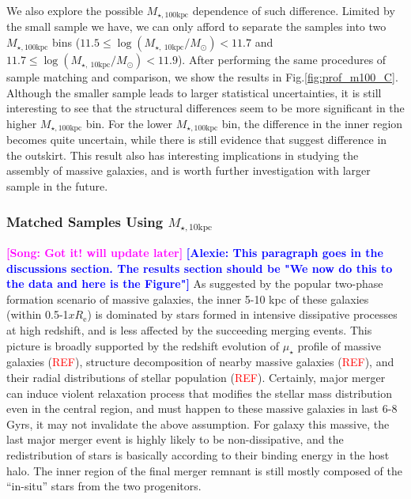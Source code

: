 \documentclass{emulateapj}
\def\minn{{$M_{\star,10\mathrm{kpc}}$}}
\def\mtot{{$M_{\star,100\mathrm{kpc}}$}}
\def\mden{{$\mu_{\star}$}}
\newcommand{\addref}{{\textcolor{red}{REF}}}
\newcommand{\song}[1]{\textcolor{magenta}{\textbf{[Song: #1]}}}
\newcommand{\alexie}[1]{\textcolor{blue}{\textbf{[Alexie: #1]}}}
\begin{document}
\begin{CJK*}{UTF8}{gbsn}
    We also explore the possible \mtot{} dependence of such difference.  
    Limited by the small sample we have, we can only afford to separate the 
    samples into two \mtot{} bins 
    ($11.5 \leq \log (M_{\star,\ 10\mathrm{kpc}}/M_{\odot}) < 11.7$ and 
     $11.7 \leq \log (M_{\star,\ 10\mathrm{kpc}}/M_{\odot}) < 11.9$).  
    After performing the same procedures of sample matching and comparison, 
    we show the results in Fig.\ref{fig:prof_m100_C}.  
    Although the smaller sample leads to larger statistical uncertainties, 
    it is still interesting to see that the structural differences seem to 
    be more significant in the higher \mtot{} bin.  
    For the lower \mtot{} bin, the difference in the inner region becomes quite 
    uncertain, while there is still evidence that suggest difference in the 
    outskirt.  
    This result also has interesting implications in studying the assembly 
    of massive galaxies, and is worth further investigation with larger sample
    in the future.  


\subsubsection{Matched Samples Using \minn{}}
    \label{sssec:sbp_minn}

    \song{Got it! will update later}
    \alexie{This paragraph goes in the discussions section. The results section should be "We now do this to the data and here is the Figure"} As suggested by the popular two-phase formation scenario of massive galaxies, 
    the inner 5-10 kpc of these galaxies (within 0.5-1$xR_{\mathrm{e}}$) is 
    dominated by stars formed in intensive dissipative processes at high redshift, 
    and is less affected by the succeeding merging events.  
    This picture is broadly supported by the redshift evolution of \mden{} profile
    of massive galaxies (\addref), structure decomposition of nearby massive galaxies 
    (\addref), and their radial distributions of stellar population (\addref).      
    Certainly, major merger can induce violent relaxation process that modifies the 
    stellar mass distribution even in the central region, and must happen to 
    these massive galaxies in last 6-8 Gyrs, it may not invalidate the above assumption.
    For galaxy this massive, the last major merger event is highly likely to be
    non-dissipative, and the redistribution of stars is basically according to their 
    binding energy in the host halo.  
    The inner region of the final merger remnant is still mostly composed 
    of the ``in-situ'' stars from the two progenitors.  
        

\end{CJK*}
\end{document}
